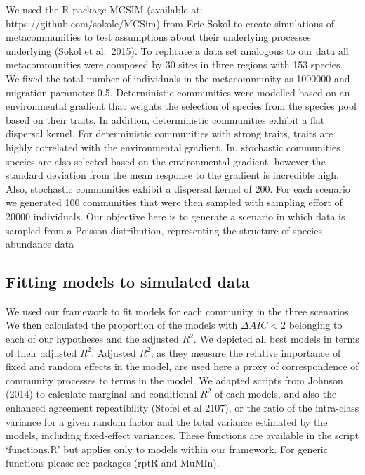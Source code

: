 We used the R package MCSIM (available at: https://github.com/sokole/MCSim) from Eric Sokol to create simulations of metacommunities to test
assumptions about their underlying processes underlying (Sokol et
al.~2015). To replicate a data set analogous to our data all
metacommunities were composed by 30 sites in three regions with 153
species. We fixed the total number of individuals in the metacommunity
as 1000000 and migration parameter 0.5. Deterministic communities were
modelled based on an environmental gradient that weights the selection
of species from the species pool based on their traits. In addition,
deterministic communities exhibit a flat dispersal kernel. For
deterministic communities with strong traits, traits are highly
correlated with the environmental gradient. In, stochastic communities
species are also selected based on the environmental gradient, however
the standard deviation from the mean response to the gradient is
incredible high. Also, stochastic communities exhibit a dispersal
kernel of 200. For each scenario we generated 100 communities that were
then sampled with sampling effort of 20000 individuals. Our objective
here is to generate a scenario in which data is sampled from a Poisson
distribution, representing the structure of species abundance data

\subsection*{Fitting models to simulated
data}\label{fitting-models-to-simulated-data}

We used our framework to fit models for each community in the three
scenarios. We then calculated the proportion of the models with
\(\Delta{AIC} < 2\) belonging to each of our hypotheses and the adjusted
\(R^{2}\). We depicted all best models in terms of their adjusted
\(R^{2}\). Adjusted \(R^{2}\), as they measure the relative importance
of fixed and random effects in the model, are used here a proxy of
correspondence of community processes to terms in the model. We adapted
scripts from Johnson (2014) to calculate marginal and conditional
\(R^{2}\) of each models, and also the enhanced agreement repeatibility
(Stofel et al 2107), or the ratio of the intra-class variance for a
given random factor and the total variance estimated by the models,
including fixed-effect variances. These functions are available in the
script `functions.R' but applies only to models within our framework.
For generic functions please see packages (rptR and MuMIn).

